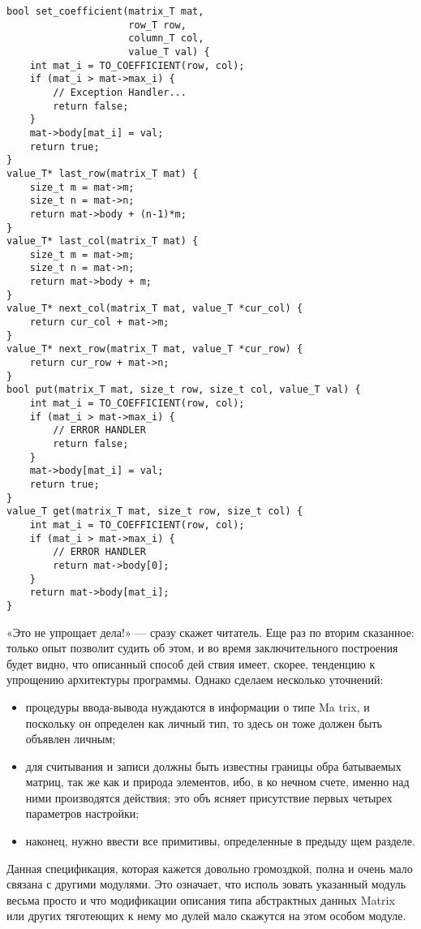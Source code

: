 \begin{lstlisting}
bool set_coefficient(matrix_T mat,
                     row_T row,
                     column_T col,
                     value_T val) {
    int mat_i = TO_COEFFICIENT(row, col);
    if (mat_i > mat->max_i) {
        // Exception Handler...
        return false;
    }
    mat->body[mat_i] = val;
    return true;
}
value_T* last_row(matrix_T mat) {
    size_t m = mat->m;
    size_t n = mat->n;
    return mat->body + (n-1)*m;
}
value_T* last_col(matrix_T mat) {
    size_t m = mat->m;
    size_t n = mat->n;
    return mat->body + m;
}
value_T* next_col(matrix_T mat, value_T *cur_col) {
    return cur_col + mat->m;
}
value_T* next_row(matrix_T mat, value_T *cur_row) {
    return cur_row + mat->n;
}
bool put(matrix_T mat, size_t row, size_t col, value_T val) {
    int mat_i = TO_COEFFICIENT(row, col);
    if (mat_i > mat->max_i) {
        // ERROR HANDLER
        return false;
    }
    mat->body[mat_i] = val;
    return true;
}
value_T get(matrix_T mat, size_t row, size_t col) {
    int mat_i = TO_COEFFICIENT(row, col);
    if (mat_i > mat->max_i) {
        // ERROR HANDLER
        return mat->body[0];
    }
    return mat->body[mat_i];
}
\end{lstlisting}
«Это не упрощает дела!» — сразу скажет читатель. Еще раз по­
вторим сказанное: только опыт позволит судить об этом, и во время
заключительного построения будет видно, что описанный способ дей­
ствия имеет, скорее, тенденцию к упрощению архитектуры программы.
Однако сделаем несколько уточнений:
\begin{itemize}
\item процедуры ввода-вывода нуждаются в информации о типе Ma­
trix, и поскольку он определен как личный тип, то здесь он тоже
должен быть объявлен личным;
\item для считывания и записи должны быть известны границы обра­
батываемых матриц, так же как и природа элементов, ибо, в ко­
нечном счете, именно над ними производятся действия; это объ­
ясняет присутствие первых четырех параметров настройки;
\item наконец, нужно ввести все примитивы, определенные в предыду­
щем разделе.
\end{itemize}

Данная спецификация, которая кажется довольно громоздкой, полна
и очень мало связана с другими модулями. Это означает, что исполь­
зовать указанный модуль весьма просто и что модификации описания
типа абстрактных данных Matrix или других тяготеющих к нему мо­
дулей мало скажутся на этом особом модуле.

